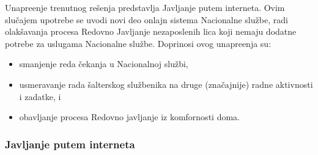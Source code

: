 Unapre\dj enje trenutnog re\v senja predstavlja Javljanje putem interneta. Ovim slu\v cajem upotrebe se uvodi novi deo onlajn sistema Nacionalne slu\v zbe, radi olak\v savanja procesa Redovno Javljanje nezaposlenih lica koji nemaju dodatne potrebe za uslugama Nacionalne slu\v zbe. Doprinosi ovog unapre\dj enja su:
\begin{itemize}
	\item smanjenje reda \v cekanja u Nacionalnoj slu\v zbi,
	\item usmeravanje rada \v salterskog slu\v zbenika na druge (zna\v cajnije) radne aktivnosti i zadatke, i
	\item obavljanje procesa Redovno javljanje iz komfornosti doma.
\end{itemize}

\subsubsection{Javljanje putem interneta}
\label{su: javljanje putem interneta}

